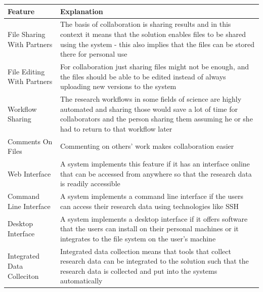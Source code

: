 \label{table:management_features}
    \begin{tabularx}{\textwidth}{| >{\raggedright}p{3cm} | X |}
    \hline
    \textbf{Feature} & \textbf{Explanation} \\
    \hline
    \rowcolor{Gray}
    File Sharing With Partners    & The basis of collaboration is sharing results and in this
                                    context it means that the solution enables files to be
                                    shared using the system - this also implies that the files
                                    can be stored there for personal use\\
    \hline
    File Editing With Partners & For collaboration just sharing files might not be enough, and
                                 the files should be able to be edited instead of always uploading
                                 new versions to the system\\
    \hline
    \rowcolor{Gray}
    Workflow Sharing    &  The research workflows in some fields of science are highly automated
                           and sharing those would save a lot of time for collaborators and the person
                           sharing them assuming he or she had to return to that workflow later\\
    \hline
    Comments On Files    & Commenting on others' work makes collaboration easier\\
    \hline
    \rowcolor{Gray}
    Web Interface          & A system implements this feature if it has an interface online that
                             can be accessed from anywhere so that the research data is readily
                             accessible\\
    \hline
    Command Line Interface    & A system implements a command line interface if the users can access
                                their research data using technologies like SSH\\
    \hline
    \rowcolor{Gray}
    Desktop Interface       & A system implements a desktop interface if it offers software that the
                              users can install on their personal machines or it integrates to the
                              file system on the user's machine\\
    \hline
    Integrated Data Colleciton    & Integrated data collection means that tools that collect research
                                    data can be integrated to the solution such that the research data
                                    is collected and put into the systems automatically\\
    \hline
\end{tabularx}


